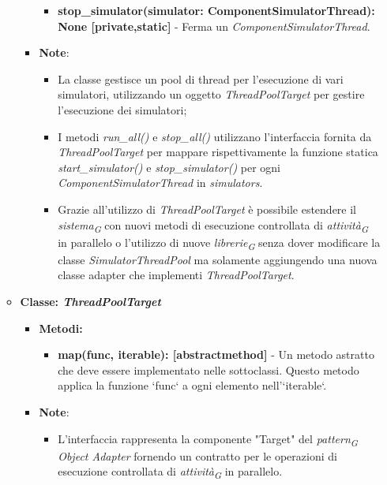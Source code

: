 \begin{itemize}
\begin{itemize}
\begin{itemize}
\begin{itemize}
        \item \textbf{stop\_simulator(simulator: ComponentSimulatorThread): None [private,static]} - Ferma un \textit{ComponentSimulatorThread}.
    \end{itemize}
    \item\textbf{Note}:
        \begin{itemize}
            \item La classe gestisce un pool di thread per l'esecuzione di vari simulatori, utilizzando un oggetto \textit{ThreadPoolTarget} per gestire l'esecuzione dei simulatori;
            \item I metodi \textit{run\_all()} e \textit{stop\_all()} utilizzano l'interfaccia fornita da \textit{ThreadPoolTarget} per mappare rispettivamente la funzione statica \textit{start\_simulator()} e \textit{stop\_simulator()} per ogni \textit{ComponentSimulatorThread} in \textit{simulators}.
            \item Grazie all'utilizzo di \textit{ThreadPoolTarget} è possibile estendere il \textit{sistema}\textsubscript{\textit{G}} con nuovi metodi di esecuzione controllata di \textit{attività}\textsubscript{\textit{G}} in parallelo o l'utilizzo di nuove \textit{librerie}\textsubscript{\textit{G}} senza dover modificare la classe \textit{SimulatorThreadPool} ma solamente aggiungendo una nuova classe adapter che implementi \textit{ThreadPoolTarget}.
        \end{itemize}
    \end{itemize}
    \item{\textbf{Classe: \textit{ThreadPoolTarget}}}
    \begin{itemize}
    \item\textbf{Metodi: }
    \begin{itemize}
        \item \textbf{map(func, iterable): [abstractmethod]} - Un metodo astratto che deve essere implementato nelle sottoclassi. Questo metodo applica la funzione `func` a ogni elemento nell'`iterable`.
    \end{itemize}
    \item\textbf{Note}:
        \begin{itemize}
            \item L'interfaccia rappresenta la componente "Target" del \textit{pattern}\textsubscript{\textit{G}} \textit{Object Adapter} fornendo un contratto per le operazioni di esecuzione controllata di \textit{attività}\textsubscript{\textit{G}} in parallelo.
         \end{itemize}

\end{itemize}
\end{itemize}
\end{itemize}
